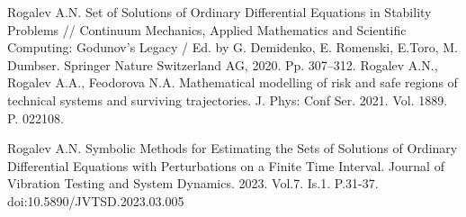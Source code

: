 \begin{thebibliography}{9}


Rogalev A.N.   Set of Solutions of Ordinary Differential Equations in Stability Problems // Continuum Mechanics, Applied Mathematics and Scientific Computing: Godunov's Legacy / Ed. by G. Demidenko, E. Romenski, E.Toro, M. Dumbser. Springer Nature Switzerland AG, 2020. Pp. 307--312. %
Rogalev A.N., Rogalev A.A., Feodorova N.A.
Mathematical modelling of risk and safe regions of technical systems and surviving trajectories. J. Phys: Conf Ser. 2021. Vol. 1889. P. 022108. %

 Rogalev A.N. Symbolic Methods for Estimating the Sets of Solutions of Ordinary Differential Equations with Perturbations on a Finite Time Interval. Journal of Vibration Testing and System Dynamics. 2023. Vol.7. Is.1. P.31-37. doi:10.5890/JVTSD.2023.03.005

\end{thebibliography}




%
